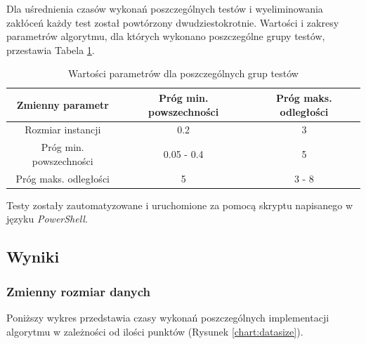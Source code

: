 \documentclass[12pt]{article}
\begin{document}
Dla uśrednienia czasów wykonań poszczególnych testów i wyeliminowania zakłóceń każdy test został powtórzony dwudziestokrotnie. Wartości i zakresy parametrów algorytmu, dla których wykonano poszczególne grupy testów, przestawia Tabela \ref{tab:params}.

\begin{table}[h!]
\centering
\begin{tabular}{|c|c|c|}
\hline
\textbf{Zmienny parametr} & \textbf{Próg min. powszechności} & \textbf{Próg maks. odległości} \\
\hline
Rozmiar instancji & 0.2 & 3 \\
Próg min. powszechności & 0.05 - 0.4 & 5 \\
Próg maks. odległości & 5 & 3 - 8 \\
\hline
\end{tabular}
\caption{Wartości parametrów dla poszczególnych grup testów}
\label{tab:params}
\end{table}

Testy zostały zautomatyzowane i uruchomione za pomocą skryptu napisanego w języku \textit{PowerShell}.

\subsection{Wyniki}

\subsubsection{Zmienny rozmiar danych}

Poniższy wykres przedstawia czasy wykonań poszczególnych implementacji algorytmu w zależności od ilości punktów (Rysunek \ref{chart:datasize}).
\end{document}
